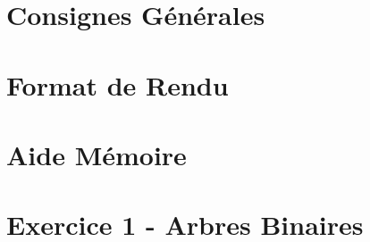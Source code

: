 \documentclass[12pt,a4paper]{article}
\begin{document}
\maketitle





\clearpage

\tableofcontents

\clearpage

\section{Consignes Générales}

\bigskip



\clearpage

\section{Format de Rendu}
\label{sec:FormatDeRendu}

\vspace*{1cm}



\clearpage

\section{Aide Mémoire}
\label{sec:AideMemoire}

\vspace*{1cm}



\clearpage


%
%
%
%


\section{Exercice 1 - Arbres Binaires}
\end{document}
